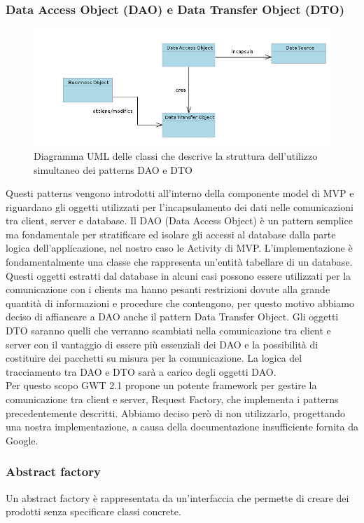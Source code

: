 \subsubsection{Data Access Object (DAO)  e  Data Transfer Object (DTO)}
\begin{figure}[h]
\centering
\includegraphics[width=15cm]{img/ST/DAO_DTO.png}
\caption{Diagramma UML delle classi che descrive la struttura dell'utilizzo
simultaneo dei patterns DAO e DTO}
\end{figure}
Questi patterns vengono introdotti all'interno della componente model di MVP e
riguardano gli oggetti utilizzati per l'incapsulamento dei dati nelle
comunicazioni tra client, server e database. 
Il DAO (Data Access Object) \`e un pattern semplice ma fondamentale per
stratificare ed isolare gli accessi al database dalla parte logica
dell'applicazione, nel nostro caso le Activity di MVP. L'implementazione \`e
fondamentalmente una classe che rappresenta un'entit\`a tabellare di un database.
Questi oggetti estratti dal database in alcuni casi possono essere utilizzati
per la comunicazione con i clients ma hanno pesanti restrizioni dovute alla
grande quantit\`a di informazioni e procedure che contengono, per questo motivo
abbiamo deciso di affiancare a DAO anche il pattern Data Transfer Object. Gli
oggetti DTO saranno quelli che verranno scambiati nella comunicazione tra client
e server con il vantaggio di essere pi\`u essenziali dei DAO e la possibilit\`a di
costituire dei pacchetti su misura per la comunicazione. La logica del
tracciamento tra DAO e DTO sar\`a a carico degli oggetti DAO.
\\
Per questo scopo GWT 2.1 propone un potente framework per gestire la
comunicazione tra client e server, Request Factory, che implementa i patterns
precedentemente descritti. Abbiamo deciso per\`o di non utilizzarlo, progettando
una nostra implementazione, a causa della documentazione insufficiente fornita
da Google.

\newpage
\subsubsection{Abstract factory}
Un abstract factory \`e rappresentata da un'interfaccia che permette di creare dei
prodotti senza specificare classi concrete.

